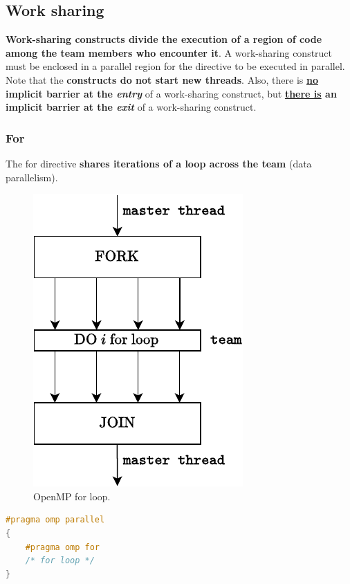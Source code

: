 \subsection{Work sharing}

\textbf{Work-sharing constructs divide the execution of a region of code among the team members who encounter it}. A work-sharing construct must be enclosed in a parallel region for the directive to be executed in parallel. Note that the \textbf{constructs do not start new threads}. Also, there is \textbf{\underline{no} implicit barrier at the \emph{entry}} of a work-sharing construct, but \textbf{\underline{there is} an implicit barrier at the \emph{exit}} of a work-sharing construct.

\longline

\subsubsection{For}

The for directive \textbf{shares iterations of a loop across the team} (data parallelism).
\begin{figure}[!htp]
    \centering
    \includegraphics[width=.3\textwidth]{img/openmp-for-1.pdf}
    \caption{OpenMP for loop.}
\end{figure}

\noindent
\begin{openmpbox}
\begin{lstlisting}[language=C++]
#pragma omp parallel
{
    #pragma omp for
    /* for loop */
}\end{lstlisting}
\end{openmpbox}

